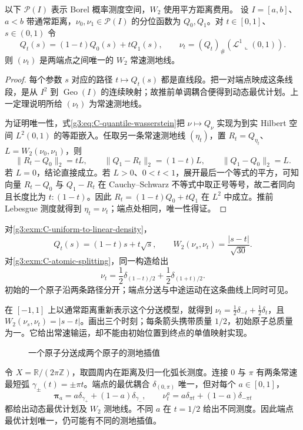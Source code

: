\begin{corollary}\label{g3:cor:C-unique-interval-geodesic}
	以下 \(\mathcal P(I)\) 表示 Borel 概率测度空间，\(W_2\) 使用平方距离费用。
	设 \(I=[a,b]\)、\(a<b\) 带通常距离，\(\nu_0,\nu_1\in\mathcal P(I)\) 的分位函数为 \(Q_0,Q_1\)。对 \(t\in[0,1]\)、\(s\in(0,1)\) 令
	\[
		Q_t(s)=(1-t)Q_0(s)+tQ_1(s),\qquad
		\nu_t=(Q_t)_\#(\mathcal L^1\llcorner(0,1)).
	\]
	则 \((\nu_t)\) 是两端点之间唯一的 \(W_2\) 常速测地线。
\end{corollary}
\begin{proof}
	每个参数 \(s\) 对应的路径 \(t\mapsto Q_t(s)\) 都是直线段。把一对端点映成这条线段，是从 \(I^2\) 到 \(\operatorname{Geo}(I)\) 的连续映射；故推前单调耦合便得到动态最优计划。上一定理说明所给 \((\nu_t)\) 为常速测地线。

	为证明唯一性，式\eqref{g3:eq:C-quantile-wasserstein}把
	\(\nu\mapsto Q_\nu\) 实现为到实 Hilbert 空间 \(L^2(0,1)\) 的等距嵌入。任取另一条常速测地线 \((\eta_t)\)，置 \(R_t=Q_{\eta_t}\)、
	\(L=W_2(\nu_0,\nu_1)\)，则
	\[
		\|R_t-Q_0\|_2=tL,\qquad
		\|Q_1-R_t\|_2=(1-t)L,\qquad
		\|Q_1-Q_0\|_2=L.
	\]
	若 \(L=0\)，结论直接成立。若 \(L>0\)、\(0<t<1\)，展开最后一个等式的平方，可知向量 \(R_t-Q_0\) 与 \(Q_1-R_t\) 在 Cauchy--Schwarz 不等式中取正号等号，故二者同向且长度比为 \(t:(1-t)\)。因此
	\(R_t=(1-t)Q_0+tQ_1\) 在 \(L^2\) 中成立。推前 Lebesgue 测度就得到 \(\eta_t=\nu_t\)；端点处相同，唯一性得证。
\end{proof}

\begin{example}\label{g3:exm:C-quantile-interpolation}
	对\cref{g3:exm:C-uniform-to-linear-density}，
	\[
		Q_t(s)=(1-t)s+t\sqrt s,\qquad
		W_2(\nu_s,\nu_t)=\frac{|s-t|}{\sqrt{30}}.
	\]
	对\cref{g3:exm:C-atomic-splitting}，同一构造给出
	\[
		\nu_t=\frac12\delta_{(1-t)/2}+\frac12\delta_{(1+t)/2}.
	\]
	初始的一个原子沿两条路径分开；端点分送与中途运动在这条曲线上同时可见。
\end{example}

在 \([-1,1]\) 上以通常距离重新表示这个分送模型，就得到
\(\nu_t=\tfrac12\delta_{-t}+\tfrac12\delta_t\)，且
\(W_2(\nu_s,\nu_t)=|s-t|\)。画出三个时刻；每条箭头携带质量 \(1/2\)，初始原子总质量为一。它给出常速输运，却不能由初始位置到终点的单值映射实现。
\begin{figure}[htbp]
	\centering
	
	\caption{一个原子分送成两个原子的测地插值}
	\label{g3:fig:C-transport-interpolation}
\end{figure}

\begin{example}\label{g3:exm:C-circle-geodesic-nonuniqueness}
	令 \(X=\mathbb R/(2\pi\mathbb Z)\)，取圆周内在距离及归一化弧长测度。连接 \(0\) 与 \(\pi\) 有两条常速最短弧
	\(\gamma_\pm(t)=\pm\pi t\)。端点的最优耦合
	\(\delta_{(0,\pi)}\) 唯一，但对每个 \(a\in[0,1]\)，
	\[
		\boldsymbol\pi_a=a\delta_{\gamma_+}+(1-a)\delta_{\gamma_-},
		\qquad
		\nu_t^a=a\delta_{\pi t}+(1-a)\delta_{-\pi t}
	\]
	都给出动态最优计划及 \(W_2\) 测地线。不同 \(a\) 在 \(t=1/2\) 给出不同测度。因此端点最优计划唯一，仍可能有不同的测地插值。
\end{example}

